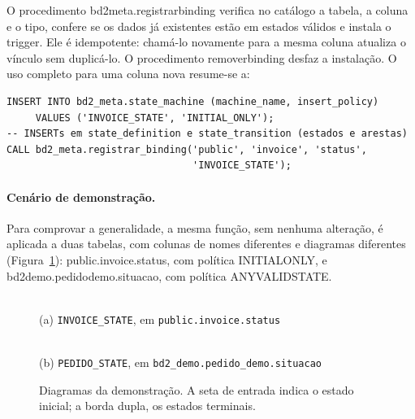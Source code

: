 \documentclass[11pt,a4paper]{article}
\newcommand{\cod}[1]{{\ttfamily\renewcommand{\_}{\textunderscore\allowbreak}#1}}
\begin{document}
O procedimento \cod{bd2\_meta.registrar\_binding} verifica no catálogo a tabela, a coluna e o tipo, confere se os
dados já existentes estão em estados válidos e instala o trigger. Ele é idempotente: chamá-lo novamente para a
mesma coluna atualiza o vínculo sem duplicá-lo. O procedimento \cod{remover\_binding} desfaz a instalação. O uso
completo para uma coluna nova resume-se a:

\begin{lstlisting}
INSERT INTO bd2_meta.state_machine (machine_name, insert_policy)
     VALUES ('INVOICE_STATE', 'INITIAL_ONLY');
-- INSERTs em state_definition e state_transition (estados e arestas)
CALL bd2_meta.registrar_binding('public', 'invoice', 'status',
                                'INVOICE_STATE');
\end{lstlisting}

\paragraph{Cenário de demonstração.} Para comprovar a generalidade, a mesma função, sem nenhuma alteração, é
aplicada a duas tabelas, com colunas de nomes diferentes e diagramas diferentes
(Figura~\ref{fig:dte}): \cod{public.invoice.status}, com política \cod{INITIAL\_ONLY}, e
\cod{bd2\_demo.pedido\_demo.situacao}, com política \cod{ANY\_VALID\_STATE}.

\begin{figure}[!htb]
\centering\small
{}\\[0.4em]
(a) \texttt{INVOICE\_STATE}, em \texttt{public.invoice.status}\\[1.6em]
\\[0.4em]
(b) \texttt{PEDIDO\_STATE}, em \texttt{bd2\_demo.pedido\_demo.situacao}
\caption{Diagramas da demonstração. A seta de entrada indica o estado inicial; a borda dupla, os estados
terminais.}
\label{fig:dte}
\end{figure}
\end{document}
